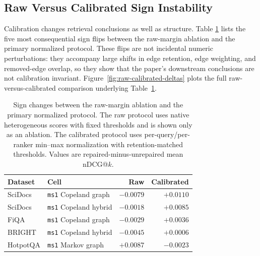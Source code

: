 \documentclass[manuscript,anonymous,review]{acmart}
\begin{document}
\subsection{Raw Versus Calibrated Sign Instability}

Calibration changes retrieval conclusions as well as structure. Table
\ref{tab:raw-calibrated-ablation} lists the five most consequential sign flips
between the raw-margin ablation and the primary normalized protocol. These
flips are not incidental numeric perturbations: they accompany large shifts in
edge retention, edge weighting, and removed-edge overlap, so they show that the
paper's downstream conclusions are not calibration invariant.
Figure~\ref{fig:raw-calibrated-deltas} plots the full raw-versus-calibrated
comparison underlying Table~\ref{tab:raw-calibrated-ablation}.

\begin{table}[t]
  \caption{Sign changes between the raw-margin ablation and the primary
    normalized protocol. The raw protocol uses native heterogeneous scores with
    fixed thresholds and is shown only as an ablation. The calibrated protocol
    uses per-query/per-ranker min--max normalization with retention-matched
    thresholds. Values are repaired-minus-unrepaired mean nDCG@$k$.}
  \label{tab:raw-calibrated-ablation}
  \begin{tabular}{llrr}
    \toprule
    Dataset & Cell & Raw & Calibrated \\
    \midrule
    SciDocs  & \texttt{ms1} Copeland graph  & $-0.0079$ & $+0.0110$ \\
    SciDocs  & \texttt{ms1} Copeland hybrid & $-0.0018$ & $+0.0085$ \\
    FiQA     & \texttt{ms1} Copeland graph  & $-0.0029$ & $+0.0036$ \\
    BRIGHT   & \texttt{ms1} Copeland hybrid & $-0.0045$ & $+0.0006$ \\
    HotpotQA & \texttt{ms1} Markov graph    & $+0.0087$ & $-0.0023$ \\
    \bottomrule
  \end{tabular}
\end{table}
\end{document}
